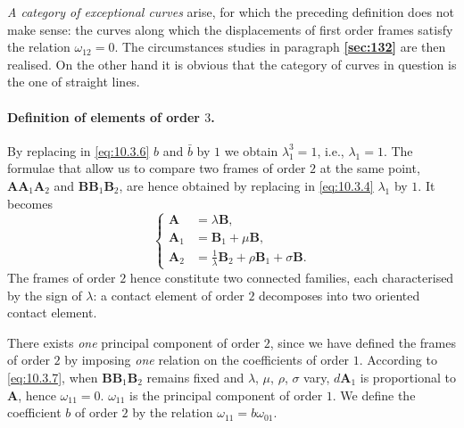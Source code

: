 \documentclass[leqno,11pt]{book}
\numberwithin{equation}{chapter}
\theoremstyle{shape1}
\theoremstyle{shapesmall}
\newcommand{\fsref}[1]{{\rm\textsection\textbf{\ref{sec:#1}}}}
\begin{document}
\emph{A category of exceptional curves} arise, for which the preceding definition does not make sense: the curves along which the displacements of first order frames satisfy the relation $\omega_{12}=0$. The circumstances studies in paragraph \fsref{132} are then realised. On the other hand it is obvious that the category of curves in question is the one of straight lines.

\paragraph{Definition of elements of order $3$.}
\label{sec:144}
By replacing in \eqref{eq:10.3.6} $b$ and $\bar b$ by $1$ we obtain $\lambda^{3}_{1}=1$, i.e., $\lambda_{1}=1$. The formulae that allow us to compare two frames of order $2$ at the same point, $\mathbf{AA}_{1}\mathbf{A}_{2}$ and $\mathbf{BB}_{1}\mathbf{B}_{2}$, are hence obtained by replacing in \eqref{eq:10.3.4} $\lambda_{1}$ by $1$. It becomes
\begin{equation}
  \label{eq:10.3.7}
  \left\{
    \begin{aligned}
      \mathbf{A}_{\phantom{0}}&=\lambda\mathbf{B},\\
      \mathbf{A}_{1}&=\mathbf{B}_{1}+\mu\mathbf{B},\\
      \mathbf{A}_{2}&=\frac{1}{\lambda}\mathbf{B}_{2}+\rho\mathbf{B}_{1}+\sigma\mathbf{B}.
    \end{aligned}
  \right.
\end{equation}
The frames of order $2$ hence constitute two connected families, each characterised by the sign of $\lambda$: a contact element of order $2$ decomposes into two oriented contact element.

There exists \emph{one} principal component of order $2$, since we have defined the frames of order $2$ by imposing \emph{one} relation on the coefficients of order $1$. According to \eqref{eq:10.3.7}, when $\mathbf{BB}_{1}\mathbf{B}_{2}$ remains fixed and $\lambda$, $\mu$, $\rho$, $\sigma$ vary, $d\mathbf{A}_{1}$ is proportional to $\mathbf{A}$, hence $\omega_{11}=0$. $\omega_{11}$ is the principal component of order $1$. We define the coefficient $b$ of order $2$ by the relation $\omega_{11}=b\omega_{01}$.
\end{document}
